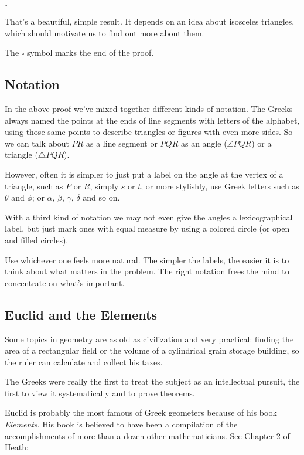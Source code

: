 \documentclass[11pt, oneside]{article}
\begin{document}
$\square$

That's a beautiful, simple result.  It depends on an idea about isosceles triangles, which should motivate us to find out more about them.

The $\square$ symbol marks the end of the proof.

\subsection*{Notation}
In the above proof we've mixed together different kinds of notation.  The Greeks always named the points at the ends of line segments with letters of the alphabet, using those same points to describe triangles or figures with even more sides.  So we can talk about $PR$ as a line segment or $PQR$ as an angle ($\angle PQR$) or a triangle ($\triangle PQR$).

However, often it is simpler to just put a label on the angle at the vertex of a triangle, such as $P$ or $R$, simply $s$ or $t$, or more stylishly, use Greek letters such as $\theta$ and $\phi$; or $\alpha$, $\beta$, $\gamma$, $\delta$ and so on. 

With a third kind of notation we may not even give the angles a lexicographical label, but just mark ones with equal measure by using a colored circle (or open and filled circles).

Use whichever one feels more natural. The simpler the labels, the easier it is to think about what matters in the problem.  The right notation frees the mind to concentrate on what's important.

\subsection*{Euclid and the Elements}

Some topics in geometry are as old as civilization and very practical:  finding the area of a rectangular field or the volume of a cylindrical grain storage building, so the ruler can calculate and collect his taxes.

The Greeks were really the first to treat the subject as an intellectual pursuit, the first to view it systematically and to prove theorems.

Euclid is probably the most famous of Greek geometers because of his book \emph{Elements}.  His book is believed to have been a compilation of the accomplishments of more than a dozen other mathematicians.  See Chapter 2 of Heath:
\end{document}
